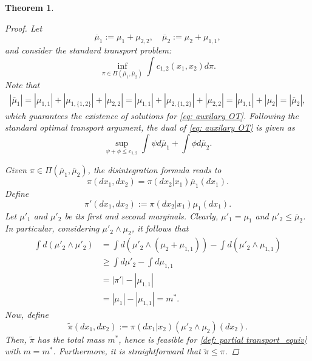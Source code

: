 \documentclass{amsart}
\theoremstyle{plain}
\numberwithin{equation}{section}\newtheorem{theorem}{Theorem}[section]
\theoremstyle{remark}
\begin{document}
\begin{theorem}
\begin{proof}
Let
\[
    \overline{\mu}_1 := \mu_1 + \mu_{2,2}, \quad \overline{\mu}_2:= \mu_2 +\mu_{1,1},
\]
and consider the standard transport problem:
\begin{equation}\label{eq: auxilary OT}
    \inf_{\pi \in \Pi(\overline{\mu}_1, \overline{\mu}_2)} \int c_{1,2}(x_1, x_2)d \pi.
\end{equation}
Note that 
\begin{align*}
    |\overline{\mu}_1| = |\mu_{1,1}| + |\mu_{1, \{1,2\}}|+ |\mu_{2,2}| = |\mu_{1,1}| + |\mu_{2, \{1,2\}}|+ |\mu_{2,2}| = |\mu_{1,1}| + |\mu_{2}| = |\overline{\mu}_2|,
\end{align*}
which guarantees the existence of solutions for \eqref{eq: auxilary OT}. Following the standard optimal transport argument, the dual of \eqref{eq: auxilary OT} is given as
\begin{equation}\label{eq: dual of auxilary OT}
    \sup_{\psi + \phi \leq c_{1,2}} \int \psi d\overline{\mu}_1 + \int \phi d\overline{\mu}_2.
\end{equation}





Given $\pi \in \Pi(\overline{\mu}_1, \overline{\mu}_2)$, the disintegration formula reads to
\[
    \pi(dx_1, dx_2) = \pi(dx_2|x_1) \overline{\mu}_1(dx_1).
\]
Define 
\[
    \pi'(dx_1, dx_2):= \pi(dx_2|x_1) \mu_1(dx_1).
\]
Let $\mu'_1$ and $\mu'_2$ be its first and second marginals. Clearly, $\mu'_1 = \mu_1$ and $\mu'_2 \leq \overline{\mu}_2$. In particular, considering $\mu'_2 \wedge \mu_2$, it follows that
\begin{align*}
    \int d (\mu'_2 \wedge \mu'_2) &= \int d (\mu'_2 \wedge (\mu_2 +\mu_{1,1})) - \int d (\mu'_2 \wedge \mu_{1,1} )\\
    &\geq \int d \mu'_2 - \int d \mu_{1,1}\\
    &= |\pi'| - |\mu_{1,1}|\\
    &= |\mu_1| - |\mu_{1,1}| = m^*.
\end{align*}
Now, define
\[
    \tilde{\pi}(dx_1, dx_2):= \pi(dx_1|x_2) (\mu'_2 \wedge \mu_2)(dx_2).
\]
Then, $\tilde{\pi}$ has the total mass $m^*$, hence is feasible for \eqref{def: partial transport_equiv} with $m=m^*$. Furthermore, it is straightforward that $\tilde{\pi} \leq \pi$.





\end{proof}
\end{theorem}
\end{document}
